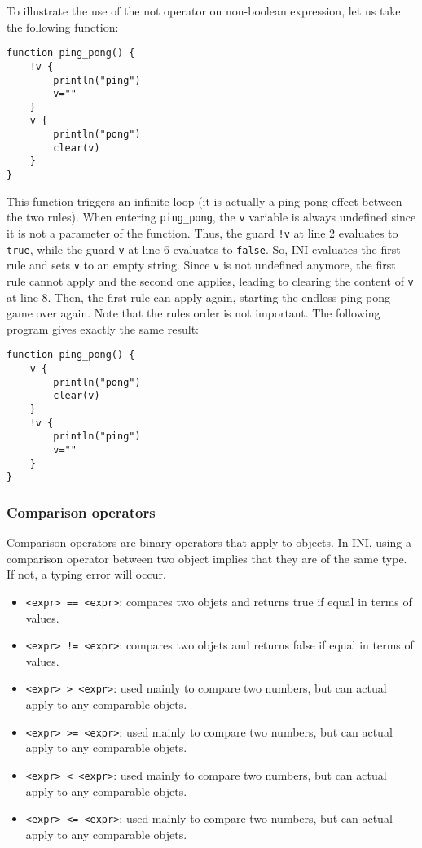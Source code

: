 \documentclass[11pt]{article}
\begin{document}
To illustrate the use of the not operator on non-boolean expression, let us take the following function:

\begin{lstlisting}
function ping_pong() {
	!v {
		println("ping")
		v=""
	}
	v {
		println("pong")
		clear(v)
	}
}
\end{lstlisting}

This function triggers an infinite loop (it is actually a ping-pong effect between the two rules). When entering \texttt{ping\_pong}, the \texttt{v} variable is always undefined since it is not a parameter of the function. Thus, the guard \texttt{!v} at line 2 evaluates to \texttt{true}, while the guard \texttt{v} at line 6 evaluates to \texttt{false}. So, INI evaluates the first rule and sets \texttt{v} to an empty string. Since \texttt{v} is not undefined anymore, the first rule cannot apply and the second one applies, leading to clearing the content of \texttt{v} at line 8. Then, the first rule can apply again, starting the endless ping-pong game over again. Note that the rules order is not important. The following program gives exactly the same result:

\begin{lstlisting}
function ping_pong() {
	v {
		println("pong")
		clear(v)
	}
	!v {
		println("ping")
		v=""
	}
}
\end{lstlisting}

\subsubsection{Comparison operators}

Comparison operators are binary operators that apply to objects. In INI, using a comparison operator between two object implies that they are of the same type. If not, a typing error will occur.

\begin{itemize}
\item \texttt{<expr> == <expr>}: compares two objets and returns true if equal in terms of values.
\item \texttt{<expr> != <expr>}: compares two objets and returns false if equal in terms of values.
\item \texttt{<expr> > <expr>}: used mainly to compare two numbers, but can actual apply to any comparable objets.
\item \texttt{<expr> >= <expr>}: used mainly to compare two numbers, but can actual apply to any comparable objets.
\item \texttt{<expr> < <expr>}: used mainly to compare two numbers, but can actual apply to any comparable objets.
\item \texttt{<expr> <= <expr>}: used mainly to compare two numbers, but can actual apply to any comparable objets.
\end{itemize}
\end{document}
